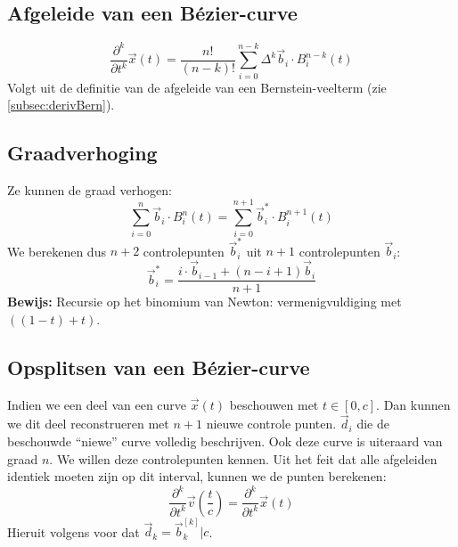 \documentclass[a4paper,titlepage]{article}
\begin{document}
\subsection{Afgeleide van een B\'ezier-curve}
\label{subsec:derivBezier}
\begin{equation}
\displaystyle\frac{\partial^k}{\partial t^k}\vec{x}\left(t\right)=\displaystyle\frac{n!}{\left(n-k\right)!}\displaystyle\sum_{i=0}^{n-k}{\Delta^k\vec{b}_i\cdot B_i^{n-k}\left(t\right)}
\end{equation}
Volgt uit de definitie van de afgeleide van een Bernstein-veelterm (zie \ref{subsec:derivBern}).
\subsection{Graadverhoging}
Ze kunnen de graad verhogen:
\begin{equation}
\displaystyle\sum_{i=0}^{n}{\vec{b}_i\cdot B_i^n\left(t\right)}=\displaystyle\sum_{i=0}^{n+1}{\vec{b}_i^*\cdot B_i^{n+1}\left(t\right)}
\end{equation}
We berekenen dus $n+2$ controlepunten $\vec{b}_i^*$ uit $n+1$ controlepunten $\vec{b}_i$:
\begin{equation}
\vec{b}_i^*=\displaystyle\frac{i\cdot \vec{b}_{i-1}+\left(n-i+1\right)\vec{b}_i}{n+1}
\end{equation}
\textbf{Bewijs:} Recursie op het binomium van Newton: vermenigvuldiging met $\left(\left(1-t\right)+t\right)$.
\subsection{Opsplitsen van een B\'ezier-curve}
Indien we een deel van een curve $\vec{x}\left(t\right)$ beschouwen met $t\in\left[0,c\right]$. Dan kunnen we dit deel reconstrueren met $n+1$ nieuwe controle punten. $\vec{d}_i$ die de beschouwde ``niewe'' curve volledig beschrijven. Ook deze curve is uiteraard van graad $n$. We willen deze controlepunten kennen.
Uit het feit dat alle afgeleiden identiek moeten zijn op dit interval, kunnen we de punten berekenen:
\begin{equation}
\displaystyle\frac{\partial^k}{\partial t^k}\vec{v}\left(\displaystyle\frac{t}{c}\right)=\displaystyle\frac{\partial^k}{\partial t^k}\vec{x}\left(t\right)
\end{equation}
Hieruit volgens voor dat $\vec{d}_k=\vec{b}_k^{[k]}|c$.
\end{document}
